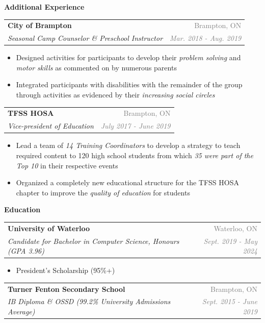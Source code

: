 \documentclass[letterpaper,10pt]{article}
\makeatletter
\newcommand{\resheading}[1]{{\large \colorbox{LightMidnightBlue}{\begin{minipage}{\textwidth}{\textbf{\textrm{#1 \vphantom{p\^{E}}}}}\end{minipage}}}}
\newcommand{\ressubheading}[4]{
\begin{tabular*}{7in}{l@{\extracolsep{\fill}}r}
        \textbf{#1} & \textcolor{gray}{#2} \\
        \textit{#3} & \textcolor{gray}{\textit{#4}} \\
\end{tabular*}\vspace{-6pt}}
\makeatother
\begin{document}
\resheading{Additional Experience}

\vspace{2mm}

    \ressubheading{City of Brampton}{Brampton, ON}{Seasonal Camp Counselor \& Preschool Instructor}{Mar. 2018 - Aug. 2019}
        \begin{itemize}
        \setlength\itemsep{0.75mm}
            \item Designed activities for participants to develop their \textit{problem solving} and \textit{motor skills} as commented on by numerous parents
            \item Integrated participants with disabilities with the remainder of the group through activities as evidenced by their \textit{increasing social circles}
        \end{itemize}
    
    \ressubheading{TFSS HOSA}{Brampton, ON}{Vice-president of Education}{July 2017 - June 2019}
    \begin{itemize}
    \setlength\itemsep{0.75mm}
        \item Lead a team of \textit{14 Training Coordinators} to develop a strategy to teach required content to 120 high school students from which \textit{35 were part of the Top 10} in their respective events
        \item Organized a completely new educational structure for the TFSS HOSA chapter to improve the \textit{quality of education} for students
    \end{itemize}

\resheading{Education}

\vspace{2mm}

\ressubheading{University of Waterloo}{Waterloo, ON}{Candidate for Bachelor in Computer Science, Honours (GPA 3.96)}{Sept. 2019 - May 2024}

\begin{itemize}
    \setlength\itemsep{0.75mm}
    \item President's Scholarship (95\%+)
\end{itemize}

\ressubheading{Turner Fenton Secondary School}{Brampton, ON}{IB Diploma \& OSSD (99.2\% University Admissions Average)}{Sept. 2015 - June 2019}
\end{document}
